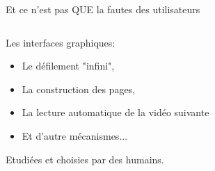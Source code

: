 \begin{frame}{Et ce n'est pas QUE la fautes des utilisateurs}
  \begin{columns}
  \begin{column}{0.5\textwidth}
    \raggedright\small
    Les interfaces graphiques:

    \begin{itemize}
      \item Le défilement "infini",
      \item La construction des pages,
      \item La lecture automatique de la vidéo suivante
      \item Et d'autre mécanismes...
    \end{itemize}

    Etudiées et choisies par des humains.
  \end{column}
  \begin{column}{0.5\textwidth}
\end{column}
\end{columns}
\end{frame}
